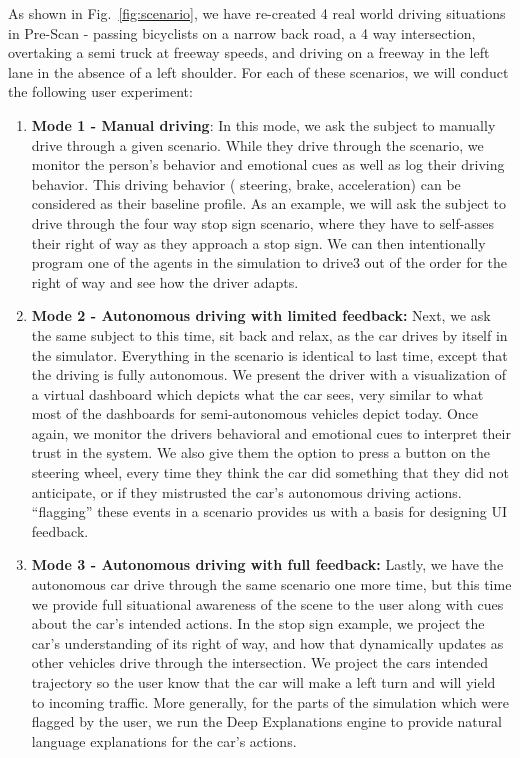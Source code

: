 As shown in Fig.~\ref{fig:scenario}, we have re-created 4 real world driving situations in Pre-Scan - passing bicyclists on a narrow back road, a 4 way intersection, overtaking a semi truck at freeway speeds, and driving on a  freeway in the left lane in the absence of a left shoulder. 
For each of these scenarios, we will conduct the following user experiment:
\begin{enumerate}[itemsep=0pt,parsep=0pt,topsep=4pt,leftmargin=0.4in]
    \item \textbf{Mode 1 - Manual driving}: In this mode, we ask the subject to manually drive through a given scenario. 
    While they drive through the scenario, we monitor the person's behavior and emotional cues as well as log their driving behavior. 
    This driving behavior ( steering, brake, acceleration) can be considered as their baseline profile. 
    As an example, we will ask the subject to drive through the four way stop sign scenario, where they have to self-asses their right of way as they approach a stop sign. We can then intentionally program one of the agents in the simulation to drive3 out of the order for the right of way and see how the driver adapts. 
    \item \textbf{Mode 2 - Autonomous driving with limited feedback:} Next, we ask the same subject to this time, sit back and relax, as the car drives by itself in the simulator. Everything in the scenario is identical to last time, except that the driving is fully autonomous. We present the driver with a visualization of a virtual dashboard which depicts what the car sees, very similar to what most of the dashboards for semi-autonomous vehicles depict today.  Once again, we monitor the drivers behavioral and emotional cues to interpret their trust in the system. We also give them the option to press a button on the steering wheel, every time they think the car did something that they did not anticipate, or if they mistrusted the car's autonomous driving actions. ``flagging'' these events in a scenario provides us with a basis for designing UI feedback. 
    \item \textbf{Mode 3 - Autonomous driving with full feedback:} Lastly, we have the autonomous car drive through the same scenario one more time, but this time we provide full situational awareness of the scene to the user along with cues about the car's intended actions. In the stop sign example, we project the car's understanding of its right of way, and how that dynamically updates as other vehicles drive through the intersection. We project the cars intended trajectory so the user know that the car will make a left turn and will yield to incoming traffic. More generally, for the parts of the simulation which were flagged by the user, we run the Deep Explanations engine to provide natural language explanations for the car's actions. 
\end{enumerate}
